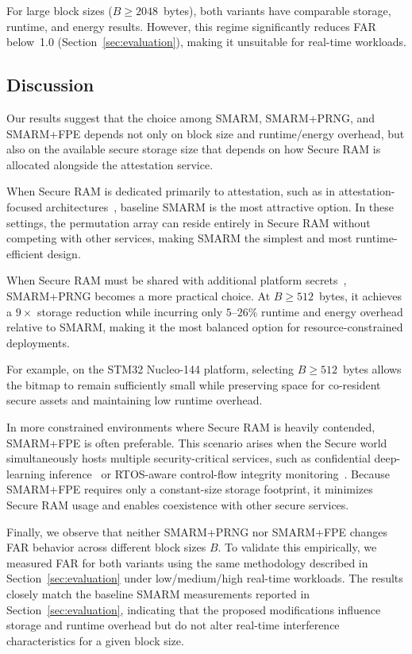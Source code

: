 \documentclass{ieeeaccess}
\newcommand{\rtsmarmone}{SMARM+PRNG\xspace}
\newcommand{\rtsmarmtwo}{SMARM+FPE\xspace}
\begin{document}
For large block sizes ($B \geq 2048$~bytes), both variants 
have comparable storage, runtime, and energy results. 
However, this regime significantly reduces FAR 
below~1.0 (Section~\ref{sec:evaluation}), making it 
unsuitable for real-time workloads.



\subsection{Discussion}
\label{sec:resmarm-discussion}

Our results suggest that the choice among SMARM, \rtsmarmone, and \rtsmarmtwo depends not only on block size and runtime/energy overhead, but also on the available secure storage size that depends on how Secure RAM is allocated alongside the attestation service.

When Secure RAM is dedicated primarily to attestation, such as in attestation-focused architectures~\cite{smart,hydra}, baseline SMARM is the most attractive option.
In these settings, the permutation array can reside entirely in Secure RAM without competing with other services, making SMARM the simplest and most runtime-efficient design.


When Secure RAM must be shared with additional platform 
secrets~\cite{silabs-secure-key-storage}, \rtsmarmone 
becomes a more practical choice. At $B \geq 512$~bytes, 
it achieves a $9\times$ storage reduction while incurring 
only $5$--$26\%$ runtime and energy overhead relative to 
SMARM, making it the most balanced option for 
resource-constrained deployments.

For example, on the STM32 Nucleo-144 platform, selecting $B \geq 512$~bytes allows the bitmap to remain sufficiently small while preserving space for co-resident secure assets and maintaining low runtime overhead.

In more constrained environments where Secure RAM is heavily contended, \rtsmarmtwo is often preferable.
This scenario arises when the Secure world simultaneously hosts multiple security-critical services, such as confidential deep-learning inference~\cite{tslices} or RTOS-aware control-flow integrity monitoring~\cite{tzmcfi}.
Because \rtsmarmtwo requires only a constant-size storage footprint, it minimizes Secure RAM usage and enables coexistence with other secure services.

Finally, we observe that neither \rtsmarmone nor \rtsmarmtwo changes FAR behavior across different block sizes $B$.
To validate this empirically, we measured FAR for both variants using the same methodology described in Section~\ref{sec:evaluation} under low/medium/high real-time workloads.
The results closely match the baseline SMARM measurements reported in Section~\ref{sec:evaluation}, indicating that the proposed modifications influence storage and runtime overhead but do not alter real-time interference characteristics for a given block size.
\end{document}
